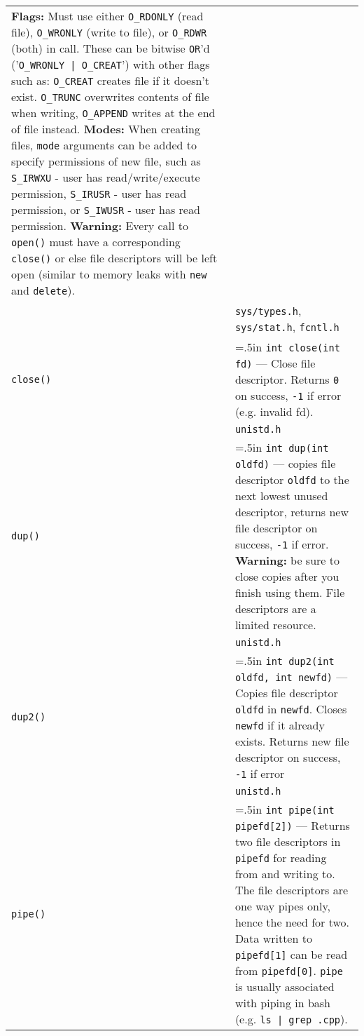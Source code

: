 \documentclass{article}
\newcommand{\indenth}[1][.5]{\hangindent=#1in
                         \hangafter=1 }
\begin{document}
\begin{longtabu}{p{1in}|p{5.7in}}
    \newline\textbf{Flags:} Must use either \texttt{O\_RDONLY} (read file), \texttt{O\_WRONLY} (write to file), or \texttt{O\_RDWR} (both) in call. These can be bitwise \texttt{OR}'d ('\texttt{O\_WRONLY | O\_CREAT}') with other flags such as:  \texttt{O\_CREAT} creates file if it doesn't exist. \texttt{O\_TRUNC} overwrites contents of file when writing, \texttt{O\_APPEND} writes at the end of file instead. 
    \newline\textbf{Modes:} When creating files, \texttt{mode} arguments can be added to specify permissions of new file, such as \texttt{S\_IRWXU} - user has read/write/execute permission, \texttt{S\_IRUSR} - user has read permission, or \texttt{S\_IWUSR} - user has read permission.
    \newline\textbf{Warning:} Every call to \texttt{open()} must have a corresponding \texttt{close()} or else file descriptors will be left open (similar to memory leaks with \texttt{new} and \texttt{delete}).
        \\
    & \texttt{sys/types.h}, \texttt{sys/stat.h}, \texttt{fcntl.h}
        \\
    \texttt{close()} & \indenth\texttt{int close(int fd)} --- Close file descriptor. Returns \texttt{0} on success, \texttt{-1} if error (e.g. invalid fd).
        \\
    & \texttt{unistd.h}
        \\ \hline
    \texttt{dup()} & \indenth\texttt{int dup(int oldfd)} --- copies file descriptor \texttt{oldfd} to the next lowest unused descriptor, returns new file descriptor on success, \texttt{-1} if error. 
    \newline\textbf{Warning:} be sure to close copies after you finish using them. File descriptors are a limited resource.
        \\
    & \texttt{unistd.h}
        \\
    \texttt{dup2()} & \indenth\texttt{int dup2(int oldfd, int newfd)} --- Copies file descriptor \texttt{oldfd} in \texttt{newfd}. Closes \texttt{newfd} if it already exists. Returns new file descriptor on success, \texttt{-1} if error
        \\
    & \texttt{unistd.h}
        \\
    \texttt{pipe()} & \indenth\texttt{int pipe(int pipefd[2])} --- Returns two file descriptors in \texttt{pipefd} for reading from and writing to. The file descriptors are one way pipes only, hence the need for two. Data written to \texttt{pipefd[1]} can be read from \texttt{pipefd[0]}. \texttt{pipe} is usually associated with piping in bash (e.g. \texttt{ls | grep .cpp}). 

\end{longtabu}
\end{document}
